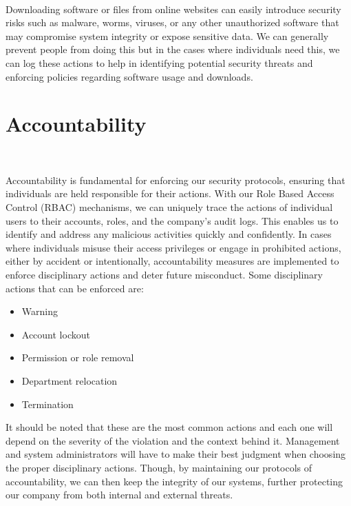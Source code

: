 \documentclass[12pt,a4paper]{report}
\begin{document}
\

Downloading software or files from online websites can easily introduce security risks such as malware, worms, viruses, or any other unauthorized software that may compromise system integrity or expose sensitive data.
We can generally prevent people from doing this but in the cases where individuals need this, we can log these actions to help in identifying potential security threats and enforcing policies regarding software usage and downloads.

\section{Accountability}
\

Accountability is fundamental for enforcing our security protocols, ensuring that individuals are held responsible for their actions.
With our Role Based Access Control (RBAC) mechanisms, we can uniquely trace the actions of individual users to their accounts, roles, and the company's audit logs. 
This enables us to identify and address any malicious activities quickly and confidently.
In cases where individuals misuse their access privileges or engage in prohibited actions, either by accident or intentionally, accountability measures are implemented to enforce disciplinary actions and deter future misconduct.
Some disciplinary actions that can be enforced are:
\begin{itemize}
 \item Warning
 \item Account lockout
 \item Permission or role removal
 \item Department relocation
 \item Termination
\end{itemize}

It should be noted that these are the most common actions and each one will depend on the severity of the violation and the context behind it.
Management and system administrators will have to make their best judgment when choosing the proper disciplinary actions.
Though, by maintaining our protocols of accountability, we can then keep the integrity of our systems, further protecting our company from both internal and external threats.
\end{document}
